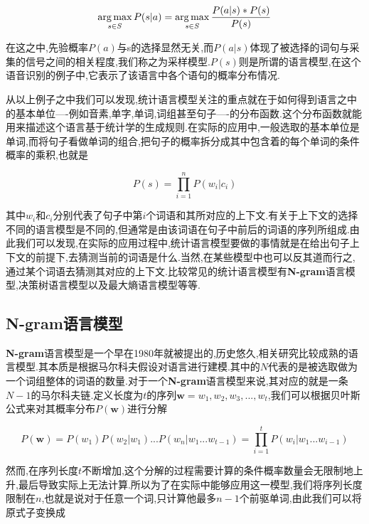 \begin{equation}
	\operatorname*{arg\,max}_{s \in S}P(s|a) = \operatorname*{arg\,max}_{s \in S}\frac{P(a|s) * P(s)}{P(s)}
\end{equation}

在这之中,先验概率$P(a)$与s的选择显然无关,而$P(a|s)$体现了被选择的词句与采集的信号之间的相关程度,我们称之为采样模型.$P(s)$则是所谓的语言模型,在这个语音识别的例子中,它表示了该语言中各个语句的概率分布情况.

从以上例子之中我们可以发现,统计语言模型关注的重点就在于如何得到语言之中的基本单位----例如音素,单字,单词,词组甚至句子----的分布函数.这个分布函数就能用来描述这个语言基于统计学的生成规则.在实际的应用中,一般选取的基本单位是单词,而将句子看做单词的组合,把句子的概率拆分成其中包含着的每个单词的条件概率的乘积,也就是

\begin{equation}
	P(s) = \prod_{i=1}^{n}P(w_i|c_i)
\end{equation}

其中$w_i$和$c_i$分别代表了句子中第$i$个词语和其所对应的上下文.有关于上下文的选择不同的语言模型是不同的,但通常是由该词语在句子中前后的词语的序列所组成.由此我们可以发现,在实际的应用过程中,统计语言模型要做的事情就是在给出句子上下文的前提下,去猜测当前的词语是什么.当然,在某些模型中也可以反其道而行之,通过某个词语去猜测其对应的上下文.比较常见的统计语言模型有\textbf{N-gram}语言模型,决策树语言模型以及最大熵语言模型等等.

\subsection{N-gram语言模型}
\label{subsec:ngram}

\textbf{N-gram}语言模型是一个早在1980年就被提出的,历史悠久,相关研究比较成熟的语言模型.其本质是根据马尔科夫假设对语言进行建模.其中的$N$代表的是被选取做为一个词组整体的词语的数量.对于一个\textbf{N-gram}语言模型来说,其对应的就是一条$N-1$的马尔科夫链\cite{fink2014n}.定义长度为$t$的序列$\mathbf{w} = w_1, w_2, w_3,...,w_t$,我们可以根据贝叶斯公式来对其概率分布$P(\mathbf{w})$进行分解

\begin{equation}
	P(\mathbf{w}) = P(w_1)P(w_2|w_1)...P(w_n|w_1...w_{t-1}) = \prod_{i=1}^{t}P(w_i|w_1...w_{i-1})
\end{equation}

然而,在序列长度$t$不断增加,这个分解的过程需要计算的条件概率数量会无限制地上升,最后导致实际上无法计算.所以为了在实际中能够应用这一模型,我们将序列长度限制在$n$,也就是说对于任意一个词,只计算他最多$n-1$个前驱单词,由此我们可以将原式子变换成

